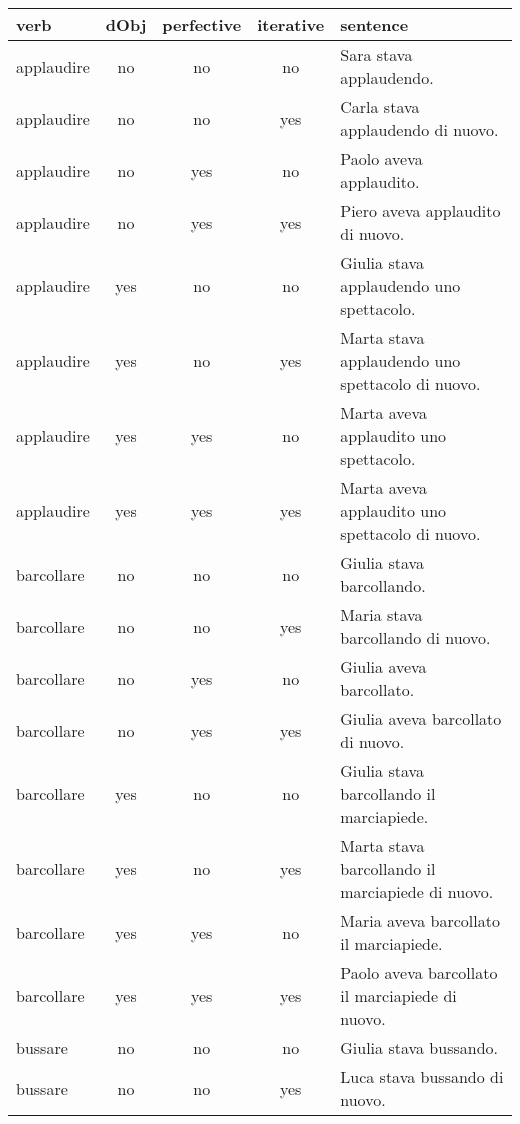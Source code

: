 \begin{longtable}{l|ccc|p{5cm}}
\textbf{verb}     & \textbf{dObj} & \textbf{perfective} & \textbf{iterative}    & \textbf{sentence} \\
\hline
\endhead
applaudire & no   & no         & no        & Sara stava applaudendo.                          \\
applaudire & no   & no         & yes       & Carla stava applaudendo di nuovo.                \\
applaudire & no   & yes        & no        & Paolo aveva applaudito.                          \\
applaudire & no   & yes        & yes       & Piero aveva applaudito di nuovo.                 \\
applaudire & yes  & no         & no        & Giulia stava applaudendo uno spettacolo.         \\
applaudire & yes  & no         & yes       & Marta stava applaudendo uno spettacolo di nuovo. \\
applaudire & yes  & yes        & no        & Marta aveva applaudito uno spettacolo.           \\
applaudire & yes  & yes        & yes       & Marta aveva applaudito uno spettacolo di nuovo.  \\
barcollare & no   & no         & no        & Giulia stava barcollando.                        \\
barcollare & no   & no         & yes       & Maria stava barcollando di nuovo.                \\
barcollare & no   & yes        & no        & Giulia aveva barcollato.                         \\
barcollare & no   & yes        & yes       & Giulia aveva barcollato di nuovo.                \\
barcollare & yes  & no         & no        & Giulia stava barcollando il marciapiede.         \\
barcollare & yes  & no         & yes       & Marta stava barcollando il marciapiede di nuovo. \\
barcollare & yes  & yes        & no        & Maria aveva barcollato il marciapiede.           \\
barcollare & yes  & yes        & yes       & Paolo aveva barcollato il marciapiede di nuovo.  \\
bussare    & no   & no         & no        & Giulia stava bussando.                           \\
bussare    & no   & no         & yes       & Luca stava bussando di nuovo.                    \\

\end{longtable}
